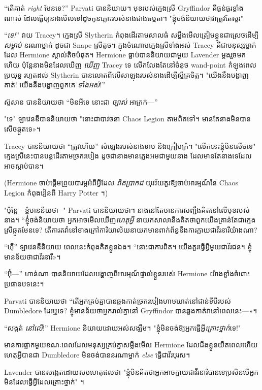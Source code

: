 {“តើគាត់ \emph{right} មែនទេ?” Parvati បាននិយាយ។ មុខរបស់ក្មេងស្រី Gryffindor គឺធ្ងន់ធ្ងរខ្លាំងណាស់ ដែលធ្វើឲ្យនាងមើលទៅដូចកូនភ្លោះរបស់នាងជាងធម្មតា។ "ខ្ញុំចង់និយាយថាវាត្រូវតែសួរ"

“\emph{ទេ!}” វាយ Tracey។ ក្មេងស្រី Slytherin កំពុងដើរតាមសាលធំ សម្លឹងមើលត្រៀមខ្លួនជាស្រេចដើម្បី \emph{សម្លាប់} នរណាម្នាក់ ដូចជា Snape ស្រីតូច។ ក្នុងចំណោមក្មេងស្រីទាំងអស់ Tracey គឺជាមនុស្សម្នាក់ដែល Hermione ស្គាល់តិចបំផុត។ Hermione ធ្លាប់បាននិយាយជាមួយ Lavender ម្តងរួចមកហើយ ប៉ុន្តែនាងមិនដែលឃើញ \emph{ឃើញ} Tracey ទេ លើកលែងតែនៅចំនុច wand-point កំឡុងពេលប្រយុទ្ធ រហូតដល់ Slytherin បានលោតពីលើសាឡុងរបស់នាងដើម្បីស្ម័គ្រចិត្ត។ "យើងនឹងបង្ហាញគាត់! យើងនឹងបង្ហាញពួកគេ \emph{ទាំងអស់}!”

ស៊ូសាន បាននិយាយថា “មិនអីទេ នោះជា \emph{ច្បាស់} អាក្រក់—”

"ទេ" ឡាវេនឌឺបាននិយាយថា "នោះជាបាវចនា Chaos Legion តាមពិតទៅ។ មាន​តែ​នាង​មិន​បាន​សើច​ឆ្កួត​ទេ»។

Tracey បាននិយាយថា “ត្រូវហើយ” សំឡេងរបស់នាងទាប និងក្រៀមក្រំ។ "លើកនេះខ្ញុំមិនសើចទេ" ក្មេងស្រីនេះបានបន្តដើរតាមច្រករបៀង ដូចជានាងមានភ្លេងអមជាមួយនាង ដែលមានតែនាងទេដែលអាចស្តាប់បាន។

(Hermione ចាប់ផ្តើមព្រួយបារម្ភអំពីអ្វីដែល \emph{ពិតប្រាកដ} យុវវ័យគួរឱ្យចាប់អារម្មណ៍នៃ Chaos Legion កំពុងរៀនពី Harry Potter ។)

"ប៉ុន្តែ - ខ្ញុំមានន័យថា -" Parvati បាននិយាយថា។ នាងនៅតែមានការសញ្ជឹងគិតនៅលើមុខរបស់នាង។ “ខ្ញុំចង់និយាយថា អ្នកអាចមើលឃើញ\emph{ហេតុអ្វី} នាយកសាលានឹងគិតថាពួកយើងគ្រាន់តែជាក្មេងស្រីឆ្កួតមែនទេ? តើ​ការ​តវ៉ា​នៅ​ខាង​ក្រៅ​ការិយាល័យ​នាយក​មាន​ពាក់ព័ន្ធ​នឹង​ការ​ក្លាយ​ជា​វីរនារី​យ៉ាង​ណា?

“ហ៊ឺ” ឡាវេនឌឺនិយាយ ពេលនេះកំពុងគិតខ្លួនឯង។ “នោះជាការពិត។ យើង​គួរ​ធ្វើ​អ្វី​មួយ​ជា​វីរជន។ ខ្ញុំ​មាន​ន័យ​ថា​ជា​វីរនារី»។

“អ៊ុំ—” ហាន់ណា បាននិយាយដែលបង្ហាញពីអារម្មណ៍ផ្ទាល់ខ្លួនរបស់ Hermione យ៉ាងខ្លាំងចំពោះប្រធានបទនេះ។

Parvati បាននិយាយថា “តើអ្នកគ្រប់គ្នាបានឆ្លងកាត់ច្រករបៀងហាមឃាត់នៅជាន់ទីបីរបស់ Dumbledore ដែរឬទេ? ខ្ញុំ​មាន​ន័យ​ថា​អ្នក​រាល់​គ្នា​នៅ Gryffindor បាន​ឆ្លង​កាត់​វា​នៅ​ពេល​នេះ—»។

“សង្កត់ \emph{នៅលើ}!” Hermione និយាយដោយអស់សង្ឃឹម។ "ខ្ញុំមិនចង់ឱ្យអ្នកធ្វើអ្វី\emph{គ្រោះថ្នាក់}ទេ!"

មានការផ្អាកមួយខណៈពេលដែលមនុស្សគ្រប់គ្នាសម្លឹងមើល Hermione ដែលដឹងខ្លួនយឺតពេលហើយ ហេតុអ្វីបានជា Dumbledore មិនចង់បាននរណាម្នាក់ \emph{else} ធ្វើជាវីរបុរស។

Lavender បានសង្កេតដោយសមហេតុផលថា "ខ្ញុំមិនគិតថាអ្នកអាចក្លាយជាវីរនារីបានទេប្រសិនបើអ្នកមិនដែលធ្វើអ្វីដែលគ្រោះថ្នាក់" ។

}
